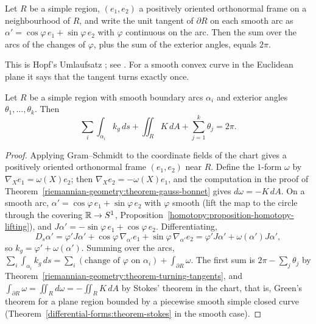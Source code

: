 \begin{theorem}\label{riemannian-geometry:theorem-turning-tangents}
Let $R$ be a simple region, $(e_1, e_2)$ a positively oriented orthonormal frame on a neighbourhood of $R$, and write the unit tangent of $\partial R$ on each smooth arc as
$\alpha' = \cos\varphi\,e_1 + \sin\varphi\,e_2$ with $\varphi$ continuous on the arc. Then the sum over the arcs of the changes of $\varphi$, plus the sum of the exterior angles,
equals $2\pi$.
\end{theorem}

This is Hopf's Umlaufsatz \cite{hopf-1935}; see \cite[Chapters 4 and 5]{do-carmo-curves-surfaces}. For a smooth convex curve in the Euclidean plane it says that the tangent turns
exactly once.

\begin{theorem}\label{riemannian-geometry:theorem-local-gauss-bonnet}
Let $R$ be a simple region with smooth boundary arcs $\alpha_i$ and exterior angles $\theta_1, \ldots, \theta_k$. Then
\[
\sum_i\int_{\alpha_i}k_g\,ds + \iint_RK\,dA + \sum_{j=1}^k\theta_j = 2\pi.
\]
\end{theorem}

\begin{proof}
Applying Gram--Schmidt to the coordinate fields of the chart gives a positively oriented orthonormal frame $(e_1, e_2)$ near $R$. Define the $1$-form $\omega$ by
$\nabla_Xe_1 = \omega(X)e_2$; then $\nabla_Xe_2 = -\omega(X)e_1$, and the computation in the proof of Theorem~\ref{riemannian-geometry:theorem-gauss-bonnet} gives
$d\omega = -K\,dA$. On a smooth arc, $\alpha' = \cos\varphi\,e_1 + \sin\varphi\,e_2$ with $\varphi$ smooth (lift the map to the circle through the covering $\mathbb{R} \to S^1$,
Proposition~\ref{homotopy:proposition-homotopy-lifting}), and $J\alpha' = -\sin\varphi\,e_1 + \cos\varphi\,e_2$. Differentiating,
\[
D_s\alpha' = \varphi'J\alpha' + \cos\varphi\,\nabla_{\alpha'}e_1 + \sin\varphi\,\nabla_{\alpha'}e_2 = \varphi'J\alpha' + \omega(\alpha')J\alpha',
\]
so $k_g = \varphi' + \omega(\alpha')$. Summing over the arcs, $\sum_i\int_{\alpha_i}k_g\,ds = \sum_i(\text{change of }\varphi\text{ on }\alpha_i) + \int_{\partial R}\omega$. The first sum is
$2\pi - \sum_j\theta_j$ by Theorem~\ref{riemannian-geometry:theorem-turning-tangents}, and $\int_{\partial R}\omega = \iint_Rd\omega = -\iint_RK\,dA$ by Stokes' theorem in the chart, that
is, Green's theorem for a plane region bounded by a piecewise smooth simple closed curve \cite[Chapter 4]{do-carmo-curves-surfaces}
(Theorem~\ref{differential-forms:theorem-stokes} in the smooth case).
\end{proof}

